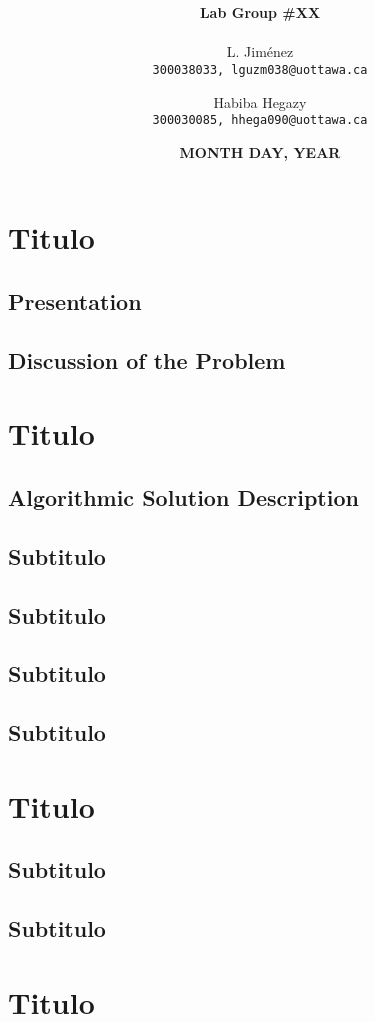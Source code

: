 \documentclass[16pt, letterpaper]{article}
\title{ 
}
\author{\textbf{\Large Lab Group \#XX} \\ \\
	L. Jiménez\\
	\texttt{300038033, lguzm038@uottawa.ca}
	\and 
	Habiba Hegazy\\
	\texttt{300030085, hhega090@uottawa.ca} 	
		}
\date{\textbf{MONTH DAY, YEAR}}
\begin{document}
	
	\begin{titlepage}
		\maketitle
	\end{titlepage}

	{ \large \tableofcontents }
	\newpage
	
		\section{Titulo}
		
			\subsection{Presentation}
		
			\subsection{Discussion of the Problem}
				
		\section{Titulo}
		
			\subsection{Algorithmic Solution Description}
			
			\subsection{Subtitulo}			
			
			\subsection{Subtitulo}
			
			\subsection{Subtitulo}
						
			\subsection{Subtitulo}
						
		\section{Titulo}
		
			\subsection{Subtitulo}
			
			
			\subsection{Subtitulo}
			
		\section{Titulo}
	
\end{document}
